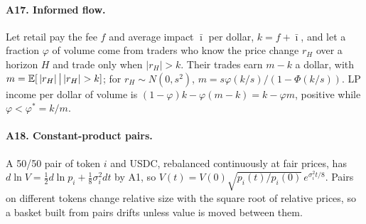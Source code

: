 \paragraph{A17. Informed flow.} Let retail pay the fee $f$ and average impact $\bar\imath$ per dollar, $k=f+\bar\imath$, and let a fraction $\varphi$ of volume come from traders who know the price change $r_H$ over a horizon $H$ and trade only when $|r_H|>k$. Their trades earn $m-k$ a dollar, with $m=\E[\,|r_H|\,\big|\,|r_H|>k]$; for $r_H\sim N(0,s^2)$, $m=s\varphi(k/s)/(1-\Phi(k/s))$. LP income per dollar of volume is $(1-\varphi)k-\varphi(m-k)=k-\varphi m$, positive while $\varphi<\varphi^{*}=k/m$.

\paragraph{A18. Constant-product pairs.} A 50/50 pair of token $i$ and USDC, rebalanced continuously at fair prices, has $d\ln V=\tfrac12d\ln p_i+\tfrac18\sigma_i^2dt$ by A1, so $V(t)=V(0)\sqrt{p_i(t)/p_i(0)}\,e^{\sigma_i^2t/8}$. Pairs on different tokens change relative size with the square root of relative prices, so a basket built from pairs drifts unless value is moved between them.
